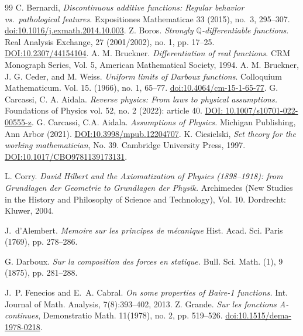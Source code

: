 \documentclass[11pt]{amsart} %
\theoremstyle{definition}
\begin{document}
\begin{thebibliography}{99}
 C. Bernardi,
\newblock \emph{Discontinuous additive functions: Regular behavior vs.\ pathological
features.}
\newblock Expositiones Mathematicae 33 (2015), no.~3, 295--307.
\href{https://doi.org/10.1016/j.exmath.2014.10.003}
{doi:10.1016/j.exmath.2014.10.003}.
 Z. Boros. \emph{Strongly $\mathbb{Q}$-differentiable functions}. Real Analysis Exchange, 27 (2001/2002), no. 1, pp. 17--25. \href{https://doi.org/10.2307/44154104}{DOI:10.2307/44154104}. 
 A. M. Bruckner. \emph{Differentiation of real functions}. CRM Monograph Series, Vol. 5, American Mathematical Society, 1994.
 A. M. Bruckner, J. G. Ceder, and M. Weiss. \emph{Uniform limits of Darboux functions}. Colloquium Mathematicum. Vol. 15. (1966), no. 1, 65--77. \href{https://doi.org/10.4064/cm-15-1-65-77}{doi:10.4064/cm-15-1-65-77}.
 G. Carcassi, C. A. Aidala. 
\newblock \emph{Reverse physics: From laws to physical assumptions.} 
\newblock Foundations of Physics vol. 52, no. 2 (2022): article 40. \href{https://doi.org/10.1007/s10701-022-00555-z}{DOI: 10.1007/s10701-022-00555-z}. 
 G. Carcassi, C.A. Aidala. 
\newblock \emph{Assumptions of Physics.} 
\newblock Michigan Publishing, Ann Arbor (2021). \href{https://doi.org/10.3998/mpub.12204707}{DOI:10.3998/mpub.12204707}. 
 K. Ciesielski, \emph{Set theory for the working mathematician}, No. 39. Cambridge University Press, 1997. \href{https://doi.org/10.1017/CBO9781139173131}{DOI:10.1017/CBO9781139173131}.

 L. Corry. 
\newblock \emph{David Hilbert and the Axiomatization of Physics (1898--1918): from Grundlagen der Geometrie to Grundlagen der Physik.}
\newblock Archimedes (New Studies in the History and Philosophy of Science and Technology), Vol. 10. Dordrecht: Kluwer, 2004.


 J.~d'Alembert. 
\newblock \emph{Memoire sur les principes de mécanique}
\newblock Hist. Acad. Sci. Paris (1769), pp. 278--286. 

 G. Darboux. 
\newblock \emph{Sur la composition des forces en statique.} 
\newblock Bull. Sci. Math. (1), 9 (1875), pp. 281--288. 

 J.~P. Fenecios and E.~A. Cabral.
\newblock \emph{On some properties of {B}aire-1 functions.}
\newblock Int. Journal of Math. Analysis, 7(8):393--402, 2013.
 Z. Grande. \emph{Sur les fonctions A-continues}, Demonstratio Math. 11(1978), no. 2, pp. 519--526. \href{https://doi.org/10.1515/dema-1978-0218}{doi:10.1515/dema-1978-0218}.


\end{thebibliography}
\end{document}
